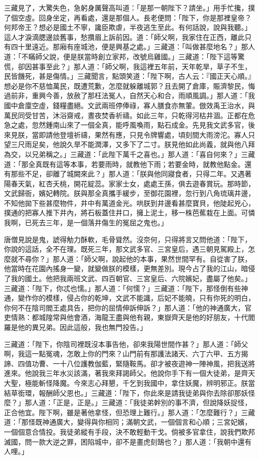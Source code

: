 三藏見了，大驚失色，急躬身厲聲高叫道：「是那一朝陛下？請坐。」用手忙攙，撲了個空虛。回身坐定，再看處，還是那個人。長老便問：「陛下，你是那裡皇帝？何邦帝王？想必是國土不寧，讒臣欺虐，半夜逃生至此。有何話說，說與我聽。」這人才淚滴腮邊談舊事，愁攢眉上訴前因。道：「師父啊，我家住在正西，離此只有四十里遠近。那廂有座城池，便是興基之處。」三藏道：「叫做甚麼地名？」那人道：「不瞞師父說，便是朕當時創立家邦，改號烏雞國。」三藏道：「陛下這等驚慌，卻因甚事至此？」那人道：「師父啊，我這裡五年前，天年乾旱，草子不生，民皆饑死，甚是傷情。」三藏聞言，點頭笑道：「陛下啊，古人云：『國正天心順。』想必是你不慈恤萬民，既遭荒歉，怎麼就躲離城郭？且去開了倉庫，賑濟黎民，悔過前非，重興今善，放赦了那枉法冤人，自然天心和合，雨順風調。」那人道：「我國中倉廩空虛，錢糧盡絕。文武兩班停俸祿，寡人膳食亦無葷。倣效禹王治水，與萬民同受甘苦，沐浴齋戒，晝夜焚香祈禱。如此三年，只乾得河枯井涸。正都在危急之處，忽然鍾南山來了一個全真，能呼風喚雨，點石成金。先見我文武多官，後來見朕，當即請他登壇祈禱，果然有應，只見令牌響處，頃刻間大雨滂沱。寡人只望三尺雨足矣，他說久旱不能潤澤，又多下了二寸。朕見他如此尚義，就與他八拜為交，以兄弟稱之。」三藏道：「此陛下萬千之喜也。」那人道：「喜自何來？」三藏道：「那全真既有這等本事，若要雨時，就教他下雨；若要金時，就教他點金。還有那些不足，卻離了城闕來此？」那人道：「朕與他同寢食者，只得二年。又遇著陽春天氣，紅杏夭桃，開花綻蕊。家家士女，處處王孫，俱去遊春賞玩。那時節，文武歸衙，嬪妃轉院。朕與那全真攜手緩步，至御花園裡，忽行到八角琉璃井邊，不知他拋下些甚麼物件，井中有萬道金光。哄朕到井邊看甚麼寶貝，他陡起兇心，撲通的把寡人推下井內，將石板蓋住井口，擁上泥土，移一株芭蕉栽在上面。可憐我啊，已死去三年，是一個落井傷生的冤屈之鬼也。」

唐僧見說是鬼，諕得觔力酥軟，毛骨聳然。沒奈何，只得將言又問他道：「陛下，你說的這話，全不在理。既死三年，那文武多官、三宮皇后，遇三朝見駕殿上，怎麼就不尋你？」那人道：「師父啊，說起他的本事，果然世間罕有。自從害了朕，他當時在花園內搖身一變，就變做朕的模樣，更無差別。現今占了我的江山，暗侵了我的國土。他把我兩班文武、四百朝官、三宮皇后、六院嬪妃，盡屬了他矣。」三藏道：「陛下，你忒也懦。」那人道：「何懦？」三藏道：「陛下，那怪倒有些神通，變作你的模樣，侵占你的乾坤，文武不能識，后妃不能曉，只有你死的明白，你何不在陰司閻王處具告，把你的屈情伸訴伸訴？」那人道：「他的神通廣大，官吏情熟：都城隍常與他會酒，海龍王盡與他有親，東嶽齊天是他的好朋友，十代閻羅是他的異兄弟。因此這般，我也無門投告。」

三藏道：「陛下，你陰司裡既沒本事告他，卻來我陽世間作甚？」那人道：「師父啊，我這一點冤魂，怎敢上你的門來？山門前有那護法諸天、六丁六甲、五方揭諦、四值功曹、一十八位護教伽藍，緊隨鞍馬。卻才被夜遊神一陣神風，把我送將進來。他說我三年水災該滿，著我來拜謁師父。他說你手下有一個大徒弟，是齊天大聖，極能斬怪降魔。今來志心拜懇，千乞到我國中，拿住妖魔，辨明邪正。朕當結草銜環，報酬師父恩也。」三藏道：「陛下，你此來是請我徒弟與你去除卻那妖怪麼？」那人道：「正是，正是。」三藏道：「我徒弟幹別的事不濟，但說降妖捉怪，正合他宜。陛下啊，雖是著他拿怪，但恐理上難行。」那人道：「怎麼難行？」三藏道：「那怪既神通廣大，變得與你相同；滿朝文武，一個個言和心順；三宮妃嬪，一個個意合情投。我徒弟縱有手段，決不敢輕動干戈。倘被多官拿住，說我們欺邦滅國，問一款大逆之罪，困陷城中，卻不是畫虎刻鵠也？」那人道：「我朝中還有人哩。」

